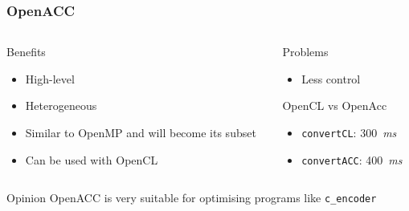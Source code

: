 \begin{frame}
  \frametitle{OpenACC}
  \begin{columns}
    \begin{column}{0.47\linewidth}
      \begin{block}{Benefits}
        \begin{itemize}
        \item High-level
        \item Heterogeneous
        \item Similar to OpenMP and will become its subset
        \item Can be used with OpenCL
        \end{itemize}
      \end{block}
    \end{column}
    \pause{}
    \begin{column}{0.47\linewidth}
      \begin{block}{Problems}
        \begin{itemize}
        \item Less control
        \end{itemize}
      \end{block}
      \pause{}
      \begin{exampleblock}{OpenCL vs OpenAcc}
        \begin{itemize}
        \item \lstinline{convertCL}: 300~\textit{ms}
        \item \lstinline{convertACC}: 400~\textit{ms}
        \end{itemize}
      \end{exampleblock}
    \end{column}
  \end{columns}
  \pause{}
  \begin{alertblock}{Opinion}
    OpenACC is very suitable for optimising programs like
    \texttt{c\_encoder}
  \end{alertblock}
\end{frame}

